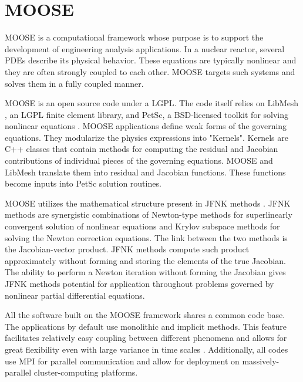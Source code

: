 \documentclass[11pt,letterpaper]{article}
\begin{document}
\section{MOOSE}

\gls{MOOSE}\cite{gaston_moose_2009} is a computational framework whose purpose is to support the development of engineering analysis applications.
In a nuclear reactor, several \glspl{PDE} describe its physical behavior.
These equations are typically nonlinear and they are often strongly coupled to each other.
\gls{MOOSE} targets such systems and solves them in a fully coupled manner.

\gls{MOOSE} is an open source code under a \gls{LGPL}.
The code itself relies on LibMesh \cite{kirk_libmesh_2006}, an LGPL finite element library, and PetSc, a \gls{BSD}-licensed toolkit for solving nonlinear equations \cite{balay_petsc_2016}.
MOOSE applications define weak forms of the governing equations.
They modularize the physics expressions into "Kernels".
Kernels are C++ classes that contain methods for computing the residual and Jacobian contributions of individual pieces of the governing equations.
\gls{MOOSE} and LibMesh translate them into residual and Jacobian functions.
These functions become inputs into PetSc solution routines.

\gls{MOOSE} utilizes the mathematical structure present in \gls{JFNK} methods \cite{knoll_jacobian-free_2004}.
\gls{JFNK} methods are synergistic combinations of Newton-type methods for superlinearly convergent solution of nonlinear equations and Krylov subspace methods for solving the Newton correction equations.
The link between the two methods is the Jacobian-vector product.
\gls{JFNK} methods compute such product approximately without forming and storing the elements of the true Jacobian.
The ability to perform a Newton iteration without forming the Jacobian gives \gls{JFNK} methods potential for application throughout problems governed by nonlinear partial differential equations.

All the software built on the \gls{MOOSE} framework shares a common code base.
The applications by default use monolithic and implicit methods.
This feature facilitates relatively easy coupling between different phenomena and allows for great flexibility even with large variance in time scales \cite{novak_pronghorn_2018}.
Additionally, all codes use MPI for parallel communication and allow for deployment on massively-parallel cluster-computing platforms.
\end{document}
